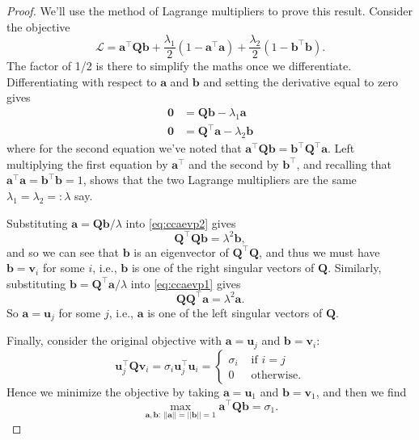\documentclass[
]{book}
\theoremstyle{definition}
\theoremstyle{definition}
\theoremstyle{definition}
\theoremstyle{definition}
\theoremstyle{remark}
\begin{document}
\begin{proof}
We'll use the method of Lagrange multipliers to prove this result. Consider the objective
\[\mathcal{L} = \mathbf a^\top \mathbf Q\mathbf b+\frac{\lambda_1}{2}(1-\mathbf a^\top\mathbf a)+\frac{\lambda_2}{2} (1-\mathbf b^\top \mathbf b).\]
The factor of 1/2 is there to simplify the maths once we differentiate.
Differentiating with respect to \(\mathbf a\) and \(\mathbf b\) and setting the derivative equal to zero gives
\begin{align}
\boldsymbol 0&= \mathbf Q\mathbf b-\lambda_1 \mathbf a\label{eq:ccaevp1}\\
\boldsymbol 0&= \mathbf Q^\top\mathbf a-\lambda_2 \mathbf b\label{eq:ccaevp2}
\end{align}
where for the second equation we've noted that \(\mathbf a^\top \mathbf Q\mathbf b= \mathbf b^\top \mathbf Q^\top \mathbf a\).
Left multiplying the first equation by \(\mathbf a^\top\) and the second by \(\mathbf b^\top\), and recalling that \(\mathbf a^\top \mathbf a=\mathbf b^\top\mathbf b=1\), shows that the two Lagrange multipliers are the same \(\lambda_1 = \lambda_2 =: \lambda\) say.

Substituting \(\mathbf a=\mathbf Q\mathbf b/\lambda\) into \eqref{eq:ccaevp2} gives
\[\mathbf Q^\top\mathbf Q\mathbf b= \lambda^2\mathbf b,\]
and so we can see that \(\mathbf b\) is an eigenvector of \(\mathbf Q^\top \mathbf Q\), and thus we must have \(\mathbf b= \mathbf v_i\) for some \(i\), i.e., \(\mathbf b\) is one of the right singular vectors of \(\mathbf Q\). Similarly, substituting \(\mathbf b= \mathbf Q^\top \mathbf a/\lambda\) into \eqref{eq:ccaevp1} gives
\[\mathbf Q\mathbf Q^\top \mathbf a= \lambda^2\mathbf a.\]
So \(\mathbf a=\mathbf u_j\) for some \(j\), i.e., \(\mathbf a\) is one of the left singular vectors of \(\mathbf Q\).

Finally, consider the original objective with \(\mathbf a=\mathbf u_j\) and \(\mathbf b=\mathbf v_i\):
\[\mathbf u_j^\top\mathbf Q\mathbf v_i = \sigma_i\mathbf u_j^\top \mathbf u_i = \begin{cases} \sigma_i &\mbox{ if } i = j\\
0 &\mbox{ otherwise.}
\end{cases}
\]
Hence we minimize the objective by taking \(\mathbf a=\mathbf u_1\) and \(\mathbf b=\mathbf v_1\), and then we find
\[\max_{\mathbf a, \mathbf b:\, \vert \vert \mathbf a\vert \vert=\vert \vert \mathbf b\vert \vert =1} \mathbf a^\top \mathbf Q\mathbf b=\sigma_1.\]
\end{proof}
\end{document}
